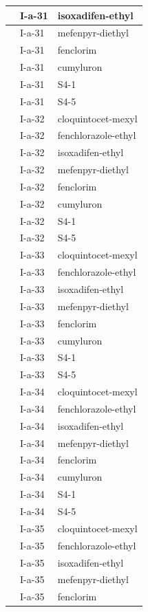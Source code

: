 \documentclass[11pt,a4paper]{article}
\begin{document}
\begin{table}[h]
\begin{tabular}{|l|l|l|}
 & I-a-31 & isoxadifen-ethyl \\ \hline
 & I-a-31 & mefenpyr-diethyl \\ \hline
 & I-a-31 & fenclorim \\ \hline
 & I-a-31 & cumyluron \\ \hline
 & I-a-31 & S4-1 \\ \hline
 & I-a-31 & S4-5 \\ \hline
 & I-a-32 & cloquintocet-mexyl \\ \hline
 & I-a-32 & fenchlorazole-ethyl \\ \hline
 & I-a-32 & isoxadifen-ethyl \\ \hline
 & I-a-32 & mefenpyr-diethyl \\ \hline
 & I-a-32 & fenclorim \\ \hline
 & I-a-32 & cumyluron \\ \hline
 & I-a-32 & S4-1 \\ \hline
 & I-a-32 & S4-5 \\ \hline
 & I-a-33 & cloquintocet-mexyl \\ \hline
 & I-a-33 & fenchlorazole-ethyl \\ \hline
 & I-a-33 & isoxadifen-ethyl \\ \hline
 & I-a-33 & mefenpyr-diethyl \\ \hline
 & I-a-33 & fenclorim \\ \hline
 & I-a-33 & cumyluron \\ \hline
 & I-a-33 & S4-1 \\ \hline
 & I-a-33 & S4-5 \\ \hline
 & I-a-34 & cloquintocet-mexyl \\ \hline
 & I-a-34 & fenchlorazole-ethyl \\ \hline
 & I-a-34 & isoxadifen-ethyl \\ \hline
 & I-a-34 & mefenpyr-diethyl \\ \hline
 & I-a-34 & fenclorim \\ \hline
 & I-a-34 & cumyluron \\ \hline
 & I-a-34 & S4-1 \\ \hline
 & I-a-34 & S4-5 \\ \hline
 & I-a-35 & cloquintocet-mexyl \\ \hline
 & I-a-35 & fenchlorazole-ethyl \\ \hline
 & I-a-35 & isoxadifen-ethyl \\ \hline
 & I-a-35 & mefenpyr-diethyl \\ \hline
 & I-a-35 & fenclorim \\ \hline

\end{tabular}
\end{table}
\end{document}
